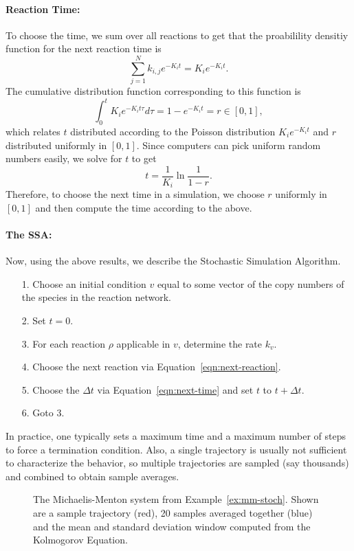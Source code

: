 \paragraph{Reaction Time:} To choose the time, we sum over all
reactions to get that the proabilility densitiy function for the next
reaction time is
%
$$
\sum_{j=1}^N k_{i,j} e^{-K_i t} = K_i e^{-K_i t}. 
$$
%
The cumulative distribution function corresponding to this function is
%
$$
\int_0^t K_i e^{-K_i t\tau} d \tau = 1 - e^{-K_i t} = r \in [0,1],
$$
which relates $t$ distributed according to the Poisson distribution
$K_i e^{-K_i t}$ and $r$ distributed uniformly in $[0,1]$. Since
computers can pick uniform random numbers easily, we solve for $t$ to
get
%
\begin{equation}\label{eqn:next-time}
t = \frac{1}{K_i} \ln \frac{1}{1-r} .
\end{equation}
%
Therefore, to choose the next time in a simulation, we choose $r$
uniformly in $[0,1]$ and then compute the time according to the above.

\paragraph{The SSA:} Now, using the above results, we describe the
Stochastic Simulation Algorithm. 
\begin{enumerate}
\item[1.] Choose an initial condition $v$ equal to some vector of the copy
  numbers of the species in the reaction network.
\item[2.] Set $t=0$.
\item[3.] For each reaction $\rho$ applicable in $v$, determine the rate $k_v$. 
\item[4.] Choose the next reaction via Equation~\ref{eqn:next-reaction}.
\item[5.] Choose the $\Delta t$ via Equation~\ref{eqn:next-time} and set
  $t$ to $t+\Delta t$. 
\item[6.] Goto 3.
\end{enumerate}

In practice, one typically sets a maximum time and a maximum number of
steps to force a termination condition. Also, a single trajectory is
usually not sufficient to characterize the behavior, so multiple
trajectories are sampled (say thousands) and combined to obtain sample
averages. 

\begin{figure}
  \caption{\label{fig:mm-stoch} The Michaelis-Menton system from
    Example~\ref{ex:mm-stoch}. Shown are a sample trajectory (red), 20
    samples averaged together (blue) and the mean and standard
    deviation window computed from the Kolmogorov Equation. }
\end{figure}

